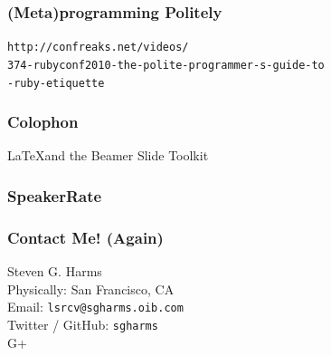 \documentclass[slidestop,compress,mathserif]{beamer}
\begin{document}
\begin{frame}
	\frametitle{(Meta)programming Politely}
	\texttt{http://confreaks.net/videos/\\374-rubyconf2010-the-polite-programmer-s-guide-to\\-ruby-etiquette}
\end{frame}


\begin{frame}
	\frametitle{Colophon}
	\LaTeX and the Beamer Slide Toolkit
\end{frame}

\begin{frame}
	\frametitle{SpeakerRate}
	\vskip 1.25cm
\end{frame}

\begin{frame}
	\frametitle{Contact Me! (Again)}
	\begin{center}
		Steven G. Harms \\
		\vskip 1.25cm	
		Physically:  San Francisco, CA\\
		Email:  \texttt{lsrcv@sgharms.oib.com} \\
		Twitter / GitHub:  \texttt{sgharms} \\
		G+
	\end{center}
\end{frame}
\end{document}
